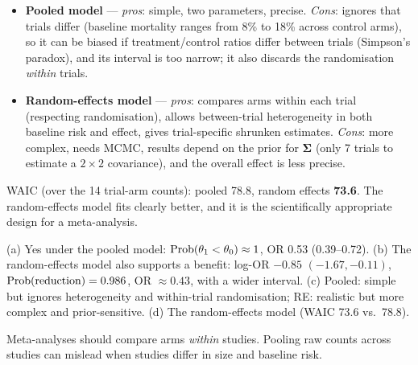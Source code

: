 \documentclass[11pt]{article}
\begin{document}
\begin{itemize}
\item \textbf{Pooled model} --- \emph{pros}: simple, two parameters, precise. \emph{Cons}: ignores that trials differ (baseline mortality ranges from 8\% to 18\% across control arms), so it can be biased if treatment/control ratios differ between trials (Simpson's paradox), and its interval is too narrow; it also discards the randomisation \emph{within} trials.
\item \textbf{Random-effects model} --- \emph{pros}: compares arms within each trial (respecting randomisation), allows between-trial heterogeneity in both baseline risk and effect, gives trial-specific shrunken estimates. \emph{Cons}: more complex, needs MCMC, results depend on the prior for $\bm\Sigma$ (only 7 trials to estimate a $2\times2$ covariance), and the overall effect is less precise.
\end{itemize}

 WAIC (over the 14 trial-arm counts): pooled 78.8, random effects \textbf{73.6}. The random-effects model fits clearly better, and it is the scientifically appropriate design for a meta-analysis.

\begin{answer}
(a) Yes under the pooled model: $\mathrm{Prob}(\theta_1<\theta_0)\approx1$, OR 0.53 (0.39--0.72). (b) The random-effects model also supports a benefit: log-OR $-0.85$ $(-1.67,-0.11)$, $\mathrm{Prob}(\text{reduction})=0.986$, OR $\approx0.43$, with a wider interval. (c) Pooled: simple but ignores heterogeneity and within-trial randomisation; RE: realistic but more complex and prior-sensitive. (d) The random-effects model (WAIC 73.6 vs.\ 78.8).
\end{answer}

\begin{takeaway}
Meta-analyses should compare arms \emph{within} studies. Pooling raw counts across studies can mislead when studies differ in size and baseline risk.
\end{takeaway}

\end{document}
